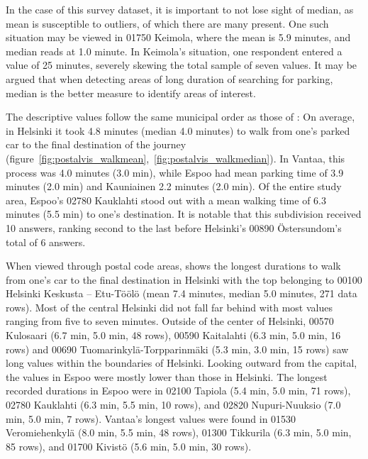 In the case of this survey dataset, it is important to not lose sight of median, as mean is susceptible to outliers, of which there are many present. One such situation may be viewed in 01750 Keimola, where the mean  is 5.9 minutes, and median reads at 1.0 minute. In Keimola's situation, one respondent entered a  value of 25 minutes, severely skewing the total sample of seven values. It may be argued that when detecting areas of long duration of searching for parking, median is the better measure to identify areas of interest.

The descriptive  values follow the same municipal order as those of : On average, in Helsinki it took 4.8 minutes (median 4.0 minutes) to walk from one's parked car to the final destination of the journey (figure~\ref{fig:postalvis_walkmean},~\ref{fig:postalvis_walkmedian}). In Vantaa, this process was 4.0 minutes (3.0 min), while Espoo had mean parking time of 3.9 minutes (2.0 min) and Kauniainen 2.2 minutes (2.0 min). Of the entire study area, Espoo's 02780 Kauklahti stood out with a mean walking time of 6.3 minutes (5.5 min) to one's destination. It is notable that this subdivision received 10 answers, ranking second to the last before Helsinki's 00890 Östersundom's total of 6 answers.

When viewed through postal code areas,  shows the longest durations to walk from one's car to the final destination in Helsinki with the top belonging to 00100 Helsinki Keskusta -- Etu-Töölö (mean 7.4 minutes, median 5.0 minutes, 271 data rows). Most of the central Helsinki did not fall far behind with most values ranging from five to seven minutes. Outside of the center of Helsinki, 00570 Kulosaari (6.7 min, 5.0 min, 48 rows), 00590 Kaitalahti (6.3 min, 5.0 min, 16 rows) and 00690 Tuomarinkylä-Torpparinmäki (5.3 min, 3.0 min, 15 rows) saw long  values within the boundaries of Helsinki. Looking outward from the capital, the  values in Espoo were mostly lower than those in Helsinki. The longest recorded durations in Espoo were in 02100 Tapiola (5.4 min, 5.0 min, 71 rows), 02780 Kauklahti (6.3 min, 5.5 min, 10 rows), and 02820 Nupuri-Nuuksio (7.0 min, 5.0 min, 7 rows). Vantaa's longest  values were found in 01530 Veromiehenkylä (8.0 min, 5.5 min, 48 rows), 01300 Tikkurila (6.3 min, 5.0 min, 85 rows), and 01700 Kivistö (5.6 min, 5.0 min, 30 rows). 

